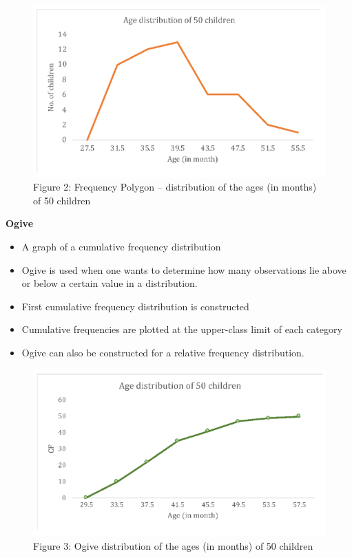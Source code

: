 \documentclass[
  a4paper,
  DIV=11,
  numbers=noendperiod,
  oneside]{scrreprt}
\providecommand{\tightlist}{%
  \setlength{\itemsep}{0pt}\setlength{\parskip}{0pt}}\usepackage{longtable,booktabs,array}
\begin{document}
\begin{figure}

{\centering \includegraphics[width=5.20833in,height=\textheight]{images/ch2/picture3.png}

}

\caption{Figure 2: Frequency Polygon -- distribution of the ages (in
months) of 50 children}

\end{figure}

\textbf{Ogive}

\begin{itemize}
\tightlist
\item
  A graph of a cumulative frequency distribution
\item
  Ogive is used when one wants to determine how many observations lie
  above or below a certain value in a distribution.
\item
  First cumulative frequency distribution is constructed
\item
  Cumulative frequencies are plotted at the upper-class limit of each
  category
\item
  Ogive can also be constructed for a relative frequency distribution.
\end{itemize}

\begin{figure}

{\centering \includegraphics[width=5.20833in,height=\textheight]{images/ch2/picture4.png}

}

\caption{Figure 3: Ogive distribution of the ages (in months) of 50
children}

\end{figure}
\end{document}
